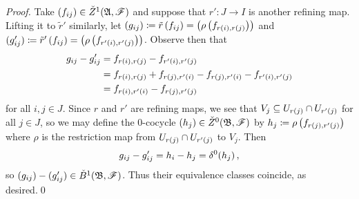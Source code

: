 \documentclass[../Moduli_Spaces_of_Riemann_Surfaces.tex]{subfiles}
\begin{document}
    \begin{proof}
        Take $\left(f_{ij}\right)\in\check{Z}^1\!\left(\mathfrak{A},\mathscr{F}\right)$ and suppose that $r':J\to I$ is another refining map. Lifting it to $\tilde{r}'$ similarly, let $\left(g_{ij}\right)\coloneqq\tilde{r}\left(f_{ij}\right)=\left(\rho\left(f_{r\left(i\right),r\left(j\right)}\right)\right)$ and $(g'_{ij})\coloneqq\tilde{r}'\left(f_{ij}\right)=\left(\rho\left(f_{r'\left(i\right),r'\left(j\right)}\right)\right)$. Observe then that
        \begin{equation*}
            \begin{aligned}
                g_{ij}-g_{ij}'&=f_{r\left(i\right),r\left(j\right)}-f_{r'\left(i\right),r'\left(j\right)} \\
                              &=f_{r\left(i\right),r\left(j\right)}+f_{r\left(j\right),r'\left(i\right)}-f_{r\left(j\right),r'\left(i\right)}-f_{r'\left(i\right),r'\left(j\right)} \\
                              &=f_{r\left(i\right),r'\left(i\right)}-f_{r\left(j\right),r'\left(j\right)}
            \end{aligned}
        \end{equation*}
        for all $i,j\in J$. Since $r$ and $r'$ are refining maps, we see that $V_j\subseteq U_{r\left(j\right)}\cap U_{r'\left(j\right)}$ for all $j\in J$, so we may define the $0$-cocycle $\left(h_j\right)\in\check{Z}^0\!\left(\mathfrak{B},\mathscr{F}\right)$ by $h_j\coloneqq\rho\left(f_{r\left(j\right),r'\left(j\right)}\right)$ where $\rho$ is the restriction map from $U_{r\left(j\right)}\cap U_{r'\left(j\right)}$ to $V_j$. Then
        \begin{equation*}
            g_{ij}-g_{ij}'=h_i-h_j=\delta^0\!\left(h_j\right),
        \end{equation*}
        so $\left(g_{ij}\right)-(g_{ij}')\in\check{B}^1\!\left(\mathfrak{B},\mathscr{F}\right)$. Thus their equivalence classes coincide, as desired.\qed
    \end{proof}
\end{document}
